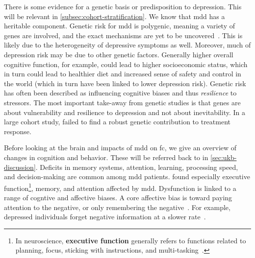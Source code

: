 There is some evidence for a genetic basis or predisposition to depression.
This will be relevant in \cref{subsec:cohort-stratification}.
We know that \gls{mdd} has a heritable component.
Genetic risk for \gls{mdd} is polygenic, meaning a variety of genes are involved, and the exact mechanisms are yet to be uncovered~\parencite{Hyman2014}.
This is likely due to the heterogeneity of depressive symptoms as well.
Moreover, much of depression risk may be due to other genetic factors.
Generally higher overall cognitive function, for example, could lead to higher socioeconomic status, which in turn could lead to healthier diet and increased sense of safety and control in the world (which in turn have been linked to lower depression risk).
Genetic risk has often been described as influencing cognitive biases and thus \emph{resilience} to stressors.
The most important take-away from genetic studies is that genes are about vulnerability and resilience to depression and not about inevitability.
%
In a large cohort study, \textcite{Garcia-Gonzalez2017} failed to find a robust genetic contribution to treatment response.

Before looking at the brain and impacts of \gls{mdd} on \gls{fc}, we give an overview of changes in cognition and behavior.
These will be referred back to in \cref{sec:ukb-discussion}.
Deficits in memory systems, attention, learning, processing speed, and decision-making are common among \gls{mdd} patients.
\textcite{Rock2014} found especially executive function\footnote{In neuroscience, \textbf{executive function} generally refers to functions related to planning, focus, sticking with instructions, and multi-tasking~\parencite{Banich2009}.}, memory, and attention affected by \gls{mdd}.
Dysfunction is linked to a range of cogntive and affective biases.
A core affective bias is toward paying attention to the negative, or only remembering the negative~\parencite{Pulcu2017}.
For example, depressed individuals forget negative information at a slower rate~\parencite{Power2000, Joormann2010}.

